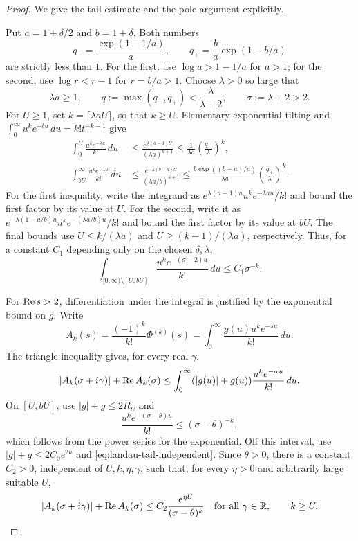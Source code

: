 \begin{proof}
We give the tail estimate and the pole argument explicitly.

Put $a=1+\delta/2$ and $b=1+\delta$. Both numbers
\[
 q_- = \frac{\exp(1-1/a)}{a},\qquad
 q_+ = \frac ba\exp(1-b/a)
\]
are strictly less than $1$. For the first, use
$\log a>1-1/a$ for $a>1$; for the second, use
$\log r<r-1$ for $r=b/a>1$. Choose $\lambda>0$ so large that
\[
 \lambda a\ge1,\qquad
 q:=\max(q_-,q_+)<\frac{\lambda}{\lambda+2},
 \qquad \sigma:=\lambda+2>2.
\]
For $U\ge1$, set $k=\lceil\lambda aU\rceil$, so that $k\ge U$.
Elementary exponential tilting and
$\int_0^\infty u^ke^{-tu}\,du=k!t^{-k-1}$ give
\begin{align*}
 \int_0^U\frac{u^ke^{-\lambda u}}{k!}\,du
 &\le \frac{e^{\lambda(a-1)U}}{(\lambda a)^{k+1}}
 \le \frac1{\lambda a}\left(\frac{q_-}{\lambda}\right)^k,\\
 \int_{bU}^\infty\frac{u^ke^{-\lambda u}}{k!}\,du
 &\le \frac{e^{-\lambda(b-a)U}}{(\lambda a/b)^{k+1}}
 \le \frac{b\exp((b-a)/a)}{\lambda a}
          \left(\frac{q_+}{\lambda}\right)^k.
\end{align*}
For the first inequality, write the integrand as
$e^{\lambda(a-1)u}u^ke^{-\lambda au}/k!$ and bound the first factor
by its value at $U$. For the second, write it as
$e^{-\lambda(1-a/b)u}u^ke^{-(\lambda a/b)u}/k!$ and bound the first
factor by its value at $bU$. The final bounds use
$U\le k/(\lambda a)$ and $U\ge(k-1)/(\lambda a)$, respectively.
Thus, for a constant $C_1$ depending only on the chosen $\delta,\lambda$,
\begin{equation}\label{eq:landau-tail-independent}
 \int_{[0,\infty)\setminus[U,bU]}
      \frac{u^ke^{-(\sigma-2)u}}{k!}\,du
 \le C_1\sigma^{-k}.
\end{equation}

For $\operatorname{Re} s>2$, differentiation under the integral is justified by
the exponential bound on $g$. Write
\[
 A_k(s)=\frac{(-1)^k}{k!}\Phi^{(k)}(s)
       =\int_0^\infty\frac{g(u)u^ke^{-su}}{k!}\,du.
\]
The triangle inequality gives, for every real $\gamma$,
\[
 |A_k(\sigma+i\gamma)|+\operatorname{Re} A_k(\sigma)
 \le\int_0^\infty (|g(u)|+g(u))
               \frac{u^ke^{-\sigma u}}{k!}\,du.
\]
On $[U,bU]$, use $|g|+g\le2R_U$ and
\[
 \frac{u^ke^{-(\sigma-\theta)u}}{k!}
 \le(\sigma-\theta)^{-k},
\]
which follows from the power series for the exponential.
Off this interval, use $|g|+g\le2C_0e^{2u}$ and
\eqref{eq:landau-tail-independent}. Since $\theta>0$, there is a constant
$C_2>0$, independent of $U,k,\eta,\gamma$, such that, for every
$\eta>0$ and arbitrarily large suitable $U$,
\begin{equation}\label{eq:landau-coeff-independent}
 |A_k(\sigma+i\gamma)|+\operatorname{Re} A_k(\sigma)
 \le C_2\frac{e^{\eta U}}{(\sigma-\theta)^k}
 \quad\text{for all }\gamma\in\mathbb R,
 \qquad k\ge U.
\end{equation}


\end{proof}
